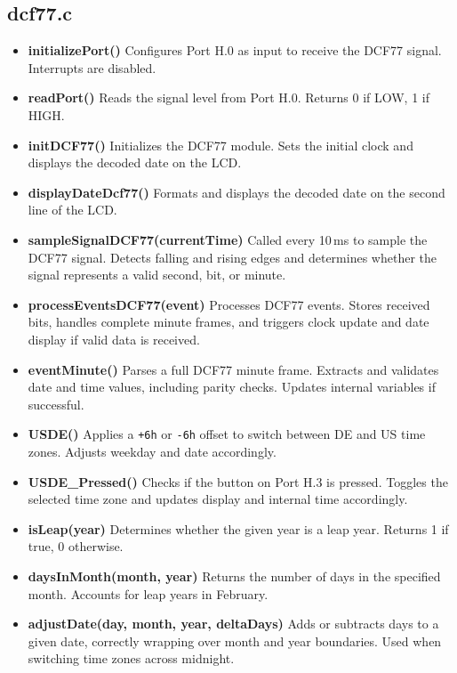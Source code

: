 \documentclass[a4paper,12pt]{article}
\begin{document}

\subsection{dcf77.c}
\begin{itemize}
    \item \textbf{initializePort()}  
    Configures Port H.0 as input to receive the DCF77 signal. Interrupts are disabled.

    \item \textbf{readPort()}  
    Reads the signal level from Port H.0. Returns 0 if LOW, 1 if HIGH.

    \item \textbf{initDCF77()}  
    Initializes the DCF77 module. Sets the initial clock and displays the decoded date on the LCD.

    \item \textbf{displayDateDcf77()}  
    Formats and displays the decoded date on the second line of the LCD.

    \item \textbf{sampleSignalDCF77(currentTime)}  
    Called every 10\,ms to sample the DCF77 signal. Detects falling and rising edges and determines whether the signal represents a valid second, bit, or minute.

    \item \textbf{processEventsDCF77(event)}  
    Processes DCF77 events. Stores received bits, handles complete minute frames, and triggers clock update and date display if valid data is received.

    \item \textbf{eventMinute()}  
    Parses a full DCF77 minute frame. Extracts and validates date and time values, including parity checks. Updates internal variables if successful.

    \item \textbf{USDE()}  
    Applies a \texttt{+6h} or \texttt{-6h} offset to switch between DE and US time zones. Adjusts weekday and date accordingly.

    \item \textbf{USDE\_Pressed()}  
    Checks if the button on Port H.3 is pressed. Toggles the selected time zone and updates display and internal time accordingly.

    \item \textbf{isLeap(year)}  
    Determines whether the given year is a leap year. Returns 1 if true, 0 otherwise.

    \item \textbf{daysInMonth(month, year)}  
    Returns the number of days in the specified month. Accounts for leap years in February.

    \item \textbf{adjustDate(day, month, year, deltaDays)}  
    Adds or subtracts days to a given date, correctly wrapping over month and year boundaries. Used when switching time zones across midnight.
\end{itemize}
\end{document}
